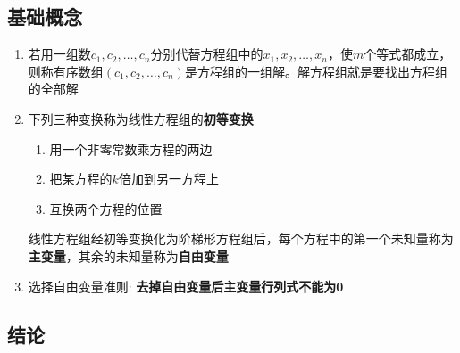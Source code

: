 \documentclass[./linear_algebra.tex]{subfiles}
\begin{document}
    \subsection{基础概念}
    \begin{enumerate}
        \item 若用一组数$c_1, c_2, \dots, c_n$分别代替方程组中的$x_1, x_2, \dots, x_n$，使$m$个等式都成立，则称有序数组$(c_1, c_2, \dots, c_n)$是方程组的一组解。解方程组就是要找出方程组的全部解
        \item 下列三种变换称为线性方程组的\textbf{初等变换}
        \begin{enumerate}
            \item 用一个非零常数乘方程的两边
            \item 把某方程的$k$倍加到另一方程上
            \item 互换两个方程的位置
        \end{enumerate}
        线性方程组经初等变换化为阶梯形方程组后，每个方程中的第一个未知量\textbf{\color{red}{通常}}称为\textbf{主变量}，其余的未知量称为\textbf{自由变量}
        \item 选择自由变量准则: \textbf{去掉自由变量后主变量行列式不能为0}
    \end{enumerate}

    \subsection{结论}
\end{document}
